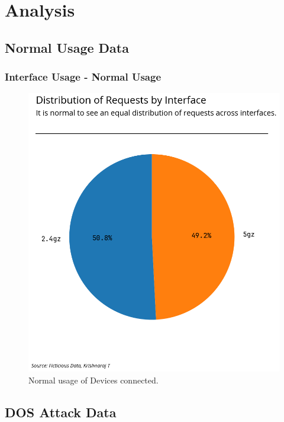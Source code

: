 \documentclass[11pt]{article}
\begin{document}
\section{Analysis}

\subsection{Normal Usage Data}


\subsubsection{Interface Usage - Normal Usage}
\begin{figure}[H]
    \centering
    \includegraphics[width=.95\textwidth]{router_log_analysis_graphs/normal_interface_usage.png}
    \caption{Normal usage of Devices connected. }
\end{figure}





\subsection{DOS Attack Data}
\end{document}
